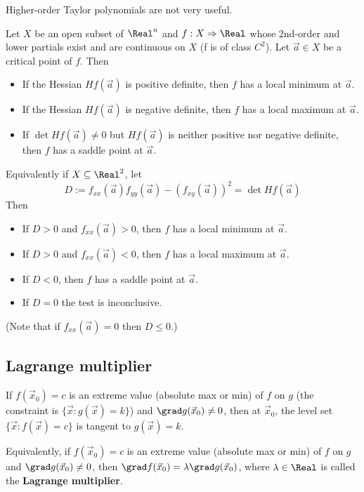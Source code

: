 Higher-order Taylor polynomials are not very useful.

\begin{theorem}
  Let $X$ be an open subset of $\Real^n$ and $f : X \Rightarrow \Real$ whose 2nd-order and lower partials exist and are continuous on $X$ (f is of class $C^2$). Let $\vec{a} \in X$ be a critical point of $f$. Then
  \begin{itemize}
    \item If the Hessian $Hf(\vec{a})$ is positive definite, then $f$ has a local minimum at $\vec{a}$.
    \item If the Hessian $Hf(\vec{a})$ is negative definite, then $f$ has a local maximum at $\vec{a}$.
    \item If $\det Hf(\vec{a}) \neq 0$ but $Hf(\vec{a})$ is neither positive nor negative definite, then $f$ has a saddle point at $\vec{a}$.
  \end{itemize}

  Equivalently if $X \subseteq \Real^2$, let
  \[
    D := f_{xx}(\vec{a}) f_{yy}(\vec{a}) - \left(f_{xy}(\vec{a})\right)^2 = \det Hf(\vec{a})
  \]
  Then
  \begin{itemize}
    \item If $D > 0$ and $f_{xx}(\vec{a}) > 0$, then $f$ has a local minimum at $\vec{a}$.
    \item If $D > 0$ and $f_{xx}(\vec{a}) < 0$, then $f$ has a local maximum at $\vec{a}$.
    \item If $D < 0$, then $f$ has a saddle point at $\vec{a}$.
    \item If $D = 0$ the test is inconclusive.
  \end{itemize}

  (Note that if $f_{xx}(\vec{a}) = 0$ then $D \leq 0$.)
\end{theorem}

\subsection{Lagrange multiplier}

\begin{theorem}
  If $f(\vec{x}_0) = c$ is an extreme value (absolute max or min) of $f$ on $g$ (the constraint is $\{ \vec{x} : g(\vec{x}) = k \}$) and $\grad g(\vec{x}_0) \neq 0$, then at $\vec{x}_0$, the level set $\{ \vec{x} : f(\vec{x}) = c \}$ is tangent to $g(\vec{x}) = k$.

  Equivalently, if $f(\vec{x}_0) = c$ is an extreme value (absolute max or min) of $f$ on $g$ and $\grad g(\vec{x}_0) \neq 0$, then $\grad f(\vec{x}_0) = \lambda \grad g(\vec{x}_0)$, where $\lambda \in \Real$ is called the \textbf{Lagrange multiplier}.
\end{theorem}

